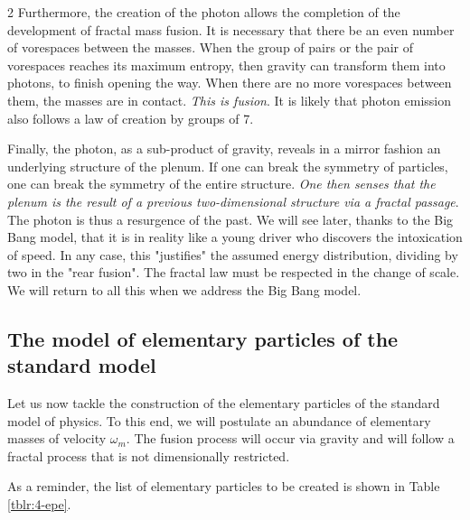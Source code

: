 \begin{multicols}{2}
	Furthermore, the creation of the photon allows the completion of the 
	development of fractal mass fusion. It is necessary that there be an even 
	number of vorespaces between the masses. When the group of pairs or the 
	pair of vorespaces reaches its maximum entropy, then gravity can 
	transform them into photons, to finish opening the way. When there are no 
	more vorespaces between them, the masses are in contact. \textit{This is 
		fusion}. It is likely that photon emission also follows a law of 
	creation by groups of 7.
	
	Finally, the photon, as a sub-product of gravity, reveals in a mirror 
	fashion an underlying structure of the plenum. If one can break the 
	symmetry of particles, one can break the symmetry of the entire 
	structure. \textit{One then senses that the plenum is the result of a 
		previous two-dimensional structure via a fractal passage}. The photon is 
	thus a resurgence of the past. We will see later, thanks to the Big Bang 
	model, that it is in reality like a young driver who discovers the 
	intoxication of speed. In any case, this "justifies" the assumed energy 
	distribution, dividing by two in the "rear fusion". The fractal law must 
	be respected in the change of scale. We will return to all this when we 
	address the Big Bang model.
	
	\subsection{The model of elementary particles of the standard model}
	
	Let us now tackle the construction of the elementary particles of the 
	standard model of physics. To this end, we will postulate an abundance of 
	elementary masses of velocity $\omega_m$. The fusion process will occur 
	via gravity and will follow a fractal process that is not 
	dimensionally restricted.
	
	As a reminder, the list of elementary particles to be created is shown in 
	Table \ref{tblr:4-epe}.
	

\end{multicols}
